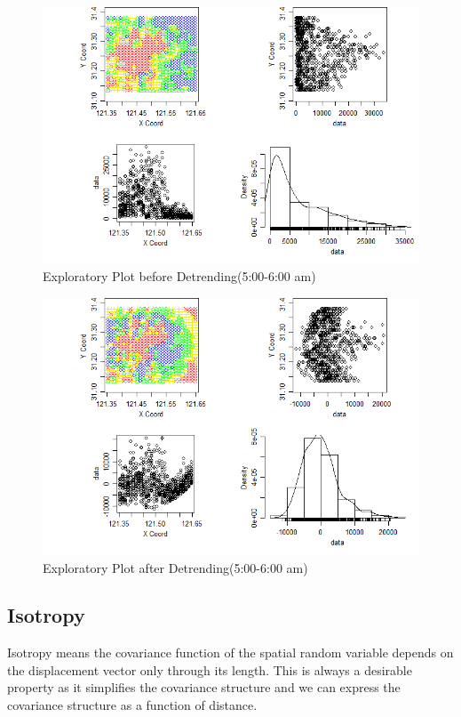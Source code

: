 \documentclass[hidelinks,12pt]{article}
\begin{document}
\begin{figure}[!ht]
		\includegraphics[width=\textwidth]{geo5.png}
		\caption{Exploratory Plot before Detrending(5:00-6:00 am) \label{fig:geo5}}
\end{figure}
\FloatBarrier

\begin{figure}[!ht]
		\includegraphics[width=\textwidth]{gres5.png}
		\caption{Exploratory Plot after Detrending(5:00-6:00 am)\label{fig:gres5}}
\end{figure}
\FloatBarrier



\subsection{Isotropy}\label{sec:anis}
Isotropy means the covariance function of the spatial random variable depends on the displacement vector only through its length. This is always a desirable property as it simplifies the covariance structure and we can express the covariance structure as a function of distance. \\
\end{document}
